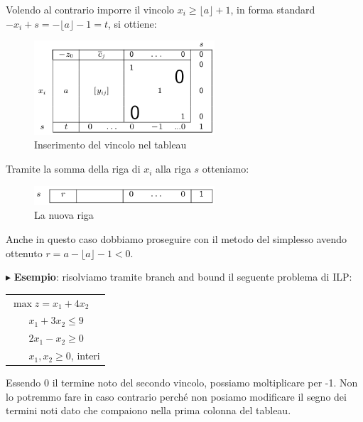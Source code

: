 \documentclass[11pt]{book}
\begin{document}
Volendo al contrario imporre il vincolo $x_i \geq \lfloor a \rfloor +
1$, in forma standard $-x_i + s = - \lfloor a \rfloor -1 = t$, si
ottiene:

\begin{figure}[h!]
  \centering
  \includegraphics[width=0.6\textwidth]{images/cap6tab10.png}
  \caption{Inserimento del vincolo nel tableau}
  \label{cap6tab10}
\end{figure}

Tramite la somma della riga di $x_i$ alla riga $s$ otteniamo:

\begin{figure}[h!]
  \centering
  \includegraphics[width=0.6\textwidth]{images/cap6tab11.png}
  \caption{La nuova riga}
  \label{cap6tab11}
\end{figure}

Anche in questo caso dobbiamo proseguire con il metodo del simplesso
avendo ottenuto $r = a - \lfloor a \rfloor -1 < 0$.

\vspace{11pt}
$\blacktriangleright$ {\bf Esempio}: risolviamo tramite branch and
bound il seguente problema di ILP:

\vspace{11pt}
\begin{center}
  \begin{tabular}{l}
    $\max z = x_1 + 4x_2$\\
    $\phantom{min}x_1 + 3x_2 \leq 9$\\
    $\phantom{min}2x_1 - x_2 \geq 0$\\
    $\phantom{min}x_1, x_2 \geq 0$, interi\\
  \end{tabular}
\end{center}
\vspace{11pt}

Essendo 0 il termine noto del secondo vincolo, possiamo moltiplicare
per -1. Non lo potremmo fare in caso contrario perch\'e non posiamo
modificare il segno dei termini noti dato che compaiono nella prima
colonna del tableau. 
\end{document}
